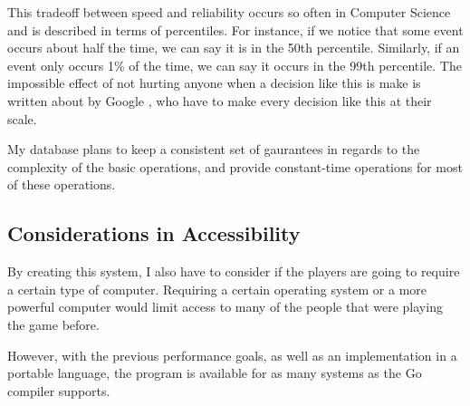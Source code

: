 \documentclass[10pt,twocolumn]{article}
\begin{document}
This tradeoff between speed and reliability occurs so often in Computer Science 
and is described in terms of percentiles. For instance, if we notice that some
event occurs about half the time, we can say it is in the 50th percentile.
Similarly, if an event only occurs 1\% of the time, we can say it occurs in the
99th percentile. The impossible effect of not hurting anyone when a decision
like this is make is written about by Google \cite{dean2013tail}, who have to make every
decision like this at their scale.

My database plans to keep a consistent set of gaurantees in regards to the
complexity of the basic operations, and provide constant-time operations for
most of these operations.

\subsection{Considerations in Accessibility}

By creating this system, I also have to consider if the players are going to
require a certain type of computer. Requiring a certain operating system or a
more powerful computer would limit access to many of the people that were
playing the game before.

However, with the previous performance goals, as well as an implementation in a
portable language, the program is available for as many systems as the Go
compiler supports.

\printbibliography
\end{document}
